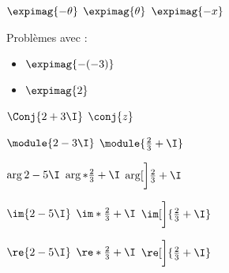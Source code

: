 \documentclass{article}
\title{\packtested}
\author{moi}
\def\esphor{\hspace{1cm}}
\begin{document}
%
\maketitle{}
%
$\expimag{-\theta}$
  \esphor  
$\expimag{\theta}$
  \esphor  
$\expimag{-x}$

Problèmes avec :
    \begin{itemize}
    \item $\expimag{-(-3)}$
    \item $\expimag{2}$
    \end{itemize}

$\Conj{2+3\I}$
  \esphor  
$\conj{z}$

$\module{2-3\I}$
  \esphor  
$\module{\frac23+\I}$

$\arg{2-5\I}$
  \esphor  
$\arg*{\frac23+\I}$
  \esphor  
$\arg[\bigg]{\frac23+\I}$

$\im{2-5\I}$
  \esphor  
$\im*{\frac23+\I}$
  \esphor  
$\im[\bigg]{\frac23+\I}$

$\re{2-5\I}$
  \esphor  
$\re*{\frac23+\I}$
  \esphor  
$\re[\bigg]{\frac23+\I}$
%
\end{document}
